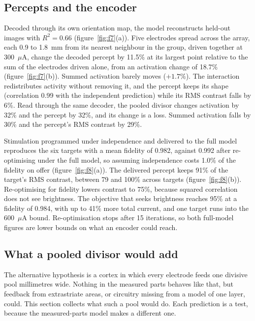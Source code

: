 \documentclass[10pt,twocolumn]{article}
\newcommand{\uA}{\ensuremath{\mu\text{A}}}
\begin{document}
\subsection{Percepts and the encoder}
\label{sec:percepts}

Decoded through its own orientation map, the model reconstructs held-out
images with $R^2 = 0.66$ (figure~\ref{fig:f7}(a)). Five electrodes spread
across the array, each 0.9 to 1.8~mm from its nearest neighbour in the
group, driven together at 300~\uA, change the decoded
percept by 11.5\% at its largest point relative to the sum of the
electrodes driven alone, from an activation change of 18.7\%
(figure~\ref{fig:f7}(b)). Summed activation barely moves ($+1.7$\%). The
interaction redistributes activity without removing it, and the percept
keeps its shape (correlation 0.99 with the independent prediction) while
its RMS contrast falls by 6\%. Read through the same decoder, the pooled
divisor changes activation by 32\% and the percept by 32\%, and its change
is a loss. Summed activation falls by 30\% and the percept's RMS contrast
by 29\%.

Stimulation programmed under independence and delivered to the full model
reproduces the six targets with a mean fidelity of 0.982, against 0.992
after re-optimising under the full model, so assuming independence costs
1.0\% of the fidelity on offer (figure~\ref{fig:f8}(a)). The delivered
percept keeps 91\% of the target's RMS contrast, between 79 and 100\%
across targets (figure~\ref{fig:f8}(b)). Re-optimising for fidelity lowers
contrast to 75\%, because squared correlation does not see brightness. The
objective that seeks brightness reaches 95\% at a fidelity of 0.984, with
up to 41\% more total current, and one target runs into the 600~\uA{}
bound. Re-optimisation stops after 15 iterations, so both full-model
figures are lower bounds on what an encoder could reach.

\subsection{What a pooled divisor would add}
\label{sec:pooled}

The alternative hypothesis is a cortex in which every electrode feeds one
divisive pool millimetres wide. Nothing in the measured parts behaves like
that, but feedback from extrastriate areas, or circuitry missing from a
model of one layer, could. This section collects what such a pool would
do. Each prediction is a test, because the measured-parts model makes a
different one.
\end{document}
